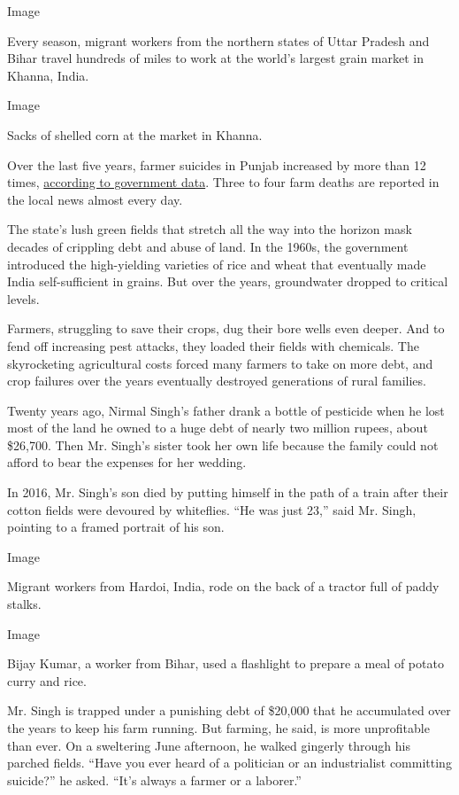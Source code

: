 Image

Every season, migrant workers from the northern states of Uttar Pradesh
and Bihar travel hundreds of miles to work at the world's largest grain
market in Khanna, India.

Image

Sacks of shelled corn at the market in Khanna.

Over the last five years, farmer suicides in Punjab increased by more
than 12 times,
\href{https://ncrb.gov.in/sites/default/files/adsi-2014\%20full\%20report.pdf}{according
to government data}. Three to four farm deaths are reported in the local
news almost every day.

The state's lush green fields that stretch all the way into the horizon
mask decades of crippling debt and abuse of land. In the 1960s, the
government introduced the high-yielding varieties of rice and wheat that
eventually made India self-sufficient in grains. But over the years,
groundwater dropped to critical levels.

Farmers, struggling to save their crops, dug their bore wells even
deeper. And to fend off increasing pest attacks, they loaded their
fields with chemicals. The skyrocketing agricultural costs forced many
farmers to take on more debt, and crop failures over the years
eventually destroyed generations of rural families.

Twenty years ago, Nirmal Singh's father drank a bottle of pesticide when
he lost most of the land he owned to a huge debt of nearly two million
rupees, about \$26,700. Then Mr. Singh's sister took her own life
because the family could not afford to bear the expenses for her
wedding.

In 2016, Mr. Singh's son died by putting himself in the path of a train
after their cotton fields were devoured by whiteflies. ``He was just
23,'' said Mr. Singh, pointing to a framed portrait of his son.

Image

Migrant workers from Hardoi, India, rode on the back of a tractor full
of paddy stalks.

Image

Bijay Kumar, a worker from Bihar, used a flashlight to prepare a meal of
potato curry and rice.

Mr. Singh is trapped under a punishing debt of \$20,000 that he
accumulated over the years to keep his farm running. But farming, he
said, is more unprofitable than ever. On a sweltering June afternoon, he
walked gingerly through his parched fields. ``Have you ever heard of a
politician or an industrialist committing suicide?'' he asked. ``It's
always a farmer or a laborer.''

